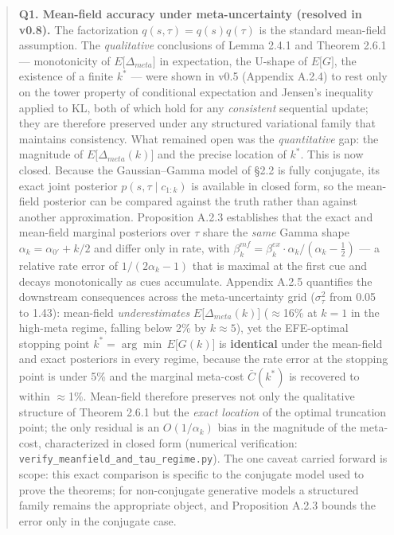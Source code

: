 \documentclass{article}
\begin{document}
\begin{quote}
\textbf{Q1. Mean-field accuracy under meta-uncertainty (resolved in
v0.8).} The factorization \(q(s,\tau) = q(s)q(\tau)\) is the standard
mean-field assumption. The \emph{qualitative} conclusions of Lemma 2.4.1
and Theorem 2.6.1 --- monotonicity of \(E\lbrack\Delta_{meta}\rbrack\)
in expectation, the U-shape of \(E\lbrack G\rbrack\), the existence of a
finite \(k^{*}\) --- were shown in v0.5 (Appendix A.2.4) to rest only on
the tower property of conditional expectation and Jensen's inequality
applied to KL, both of which hold for any \emph{consistent} sequential
update; they are therefore preserved under any structured variational
family that maintains consistency. What remained open was the
\emph{quantitative} gap: the magnitude of
\(E\lbrack\Delta_{meta}(k)\rbrack\) and the precise location of
\(k^{*}\). This is now closed. Because the Gaussian--Gamma model of \S{}2.2
is fully conjugate, its exact joint posterior \(p(s,\tau \mid c_{1:k})\)
is available in closed form, so the mean-field posterior can be compared
against the truth rather than against another approximation. Proposition
A.2.3 establishes that the exact and mean-field marginal posteriors over
\(\tau\) share the \emph{same} Gamma shape
\(\alpha_{k} = \alpha_{0'} + k/2\) and differ only in rate, with
\(\beta_{k}^{mf} = \beta_{k}^{ex} \cdot \alpha_{k}/(\alpha_{k} - \frac{1}{2})\)
--- a relative rate error of \(1/(2\alpha_{k} - 1)\) that is maximal at
the first cue and decays monotonically as cues accumulate. Appendix
A.2.5 quantifies the downstream consequences across the meta-uncertainty
grid (\(\sigma_{\tau}^{2}\) from 0.05 to 1.43): mean-field
\emph{underestimates} \(E\lbrack\Delta_{meta}(k)\rbrack\) (\ensuremath{\approx}16\% at
\(k = 1\) in the high-meta regime, falling below 2\% by
\(k \approx 5\)), yet the EFE-optimal stopping point
\(k^{*} = \arg\min\, E\lbrack G(k)\rbrack\) is \textbf{identical} under
the mean-field and exact posteriors in every regime, because the rate
error at the stopping point is under 5\% and the marginal meta-cost
\(\bar{C}(k^{*})\) is recovered to within \ensuremath{\approx}1\%. Mean-field therefore
preserves not only the qualitative structure of Theorem 2.6.1 but the
\emph{exact location} of the optimal truncation point; the only residual
is an \(O(1/\alpha_{k})\) bias in the magnitude of the meta-cost,
characterized in closed form (numerical verification:
\texttt{verify\_meanfield\_and\_tau\_regime.py}). The one caveat carried
forward is scope: this exact comparison is specific to the conjugate
model used to prove the theorems; for non-conjugate generative models a
structured family remains the appropriate object, and Proposition A.2.3
bounds the error only in the conjugate case.


\end{quote}
\end{document}
